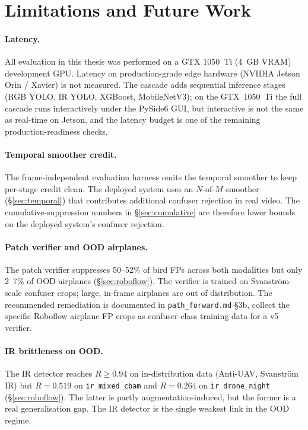 \documentclass[12pt,a4paper,oneside,openright]{book}
\begin{document}
\section{Limitations and Future Work}
\label{sec:limits}

\paragraph{Latency.}
All evaluation in this thesis was performed on a GTX 1050~Ti (4~GB VRAM) development GPU. Latency on production-grade edge hardware (NVIDIA Jetson Orin / Xavier) is not measured. The cascade adds sequential inference stages (RGB YOLO, IR YOLO, XGBoost, MobileNetV3); on the GTX~1050~Ti the full cascade runs interactively under the PySide6 GUI, but interactive is not the same as real-time on Jetson, and the latency budget is one of the remaining production-readiness checks.

\paragraph{Temporal smoother credit.}
The frame-independent evaluation harness omits the temporal smoother to keep per-stage credit clean. The deployed system uses an $N$-of-$M$ smoother (\S\ref{sec:temporal}) that contributes additional confuser rejection in real video. The cumulative-suppression numbers in \S\ref{sec:cumulative} are therefore lower bounds on the deployed system's confuser rejection.

\paragraph{Patch verifier and OOD airplanes.}
The patch verifier suppresses 50--52\% of bird FPs across both modalities but only 2--7\% of OOD airplanes (\S\ref{sec:roboflow}). The verifier is trained on Svanstr\"om-scale confuser crops; large, in-frame airplanes are out of distribution. The recommended remediation is documented in \texttt{path\_forward.md} \S3b, collect the specific Roboflow airplane FP crops as confuser-class training data for a v5 verifier.

\paragraph{IR brittleness on OOD.}
The IR detector reaches $R \geq 0.94$ on in-distribution data (Anti-UAV, Svanstr\"om IR) but $R=0.519$ on \texttt{ir\_mixed\_cbam} and $R=0.264$ on \texttt{ir\_drone\_night} (\S\ref{sec:roboflow}). The latter is partly augmentation-induced, but the former is a real generalisation gap. The IR detector is the single weakest link in the OOD regime.
\end{document}
